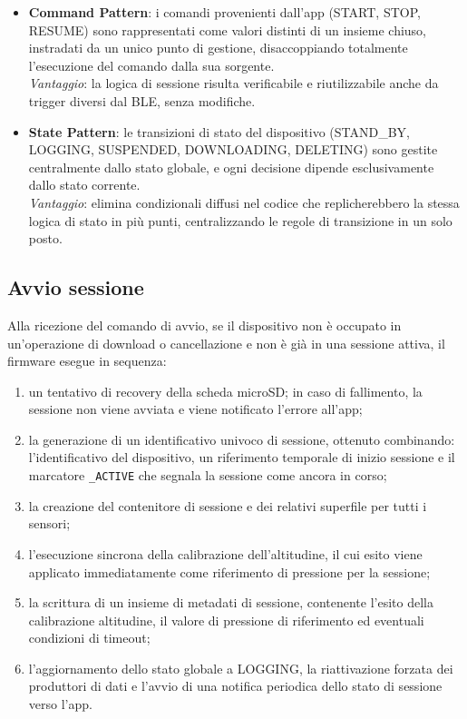\begin{itemize}
    \item \textbf{Command Pattern}: i comandi provenienti dall'app (START, STOP, RESUME) sono rappresentati come valori distinti di un insieme
    chiuso, instradati da un unico punto di gestione, disaccoppiando totalmente l'esecuzione del comando dalla sua sorgente.\\
    \textit{Vantaggio}: la logica di sessione risulta verificabile e riutilizzabile anche da trigger diversi dal BLE, senza modifiche.
    \item \textbf{State Pattern}: le transizioni di stato del dispositivo (STAND\_BY, LOGGING, SUSPENDED, DOWNLOADING, DELETING) sono gestite
    centralmente dallo stato globale, e ogni decisione dipende esclusivamente dallo stato corrente.\\
    \textit{Vantaggio}: elimina condizionali diffusi nel codice che replicherebbero la stessa logica di stato in più punti, centralizzando le
    regole di transizione in un solo posto.
\end{itemize}

\subsection{Avvio sessione}

Alla ricezione del comando di avvio, se il dispositivo non è occupato in un'operazione di download o cancellazione e non è già in una sessione
attiva, il firmware esegue in sequenza:

\begin{enumerate}
    \item un tentativo di recovery della scheda microSD; in caso di fallimento, la sessione non viene avviata e viene notificato l'errore all'app;
    \item la generazione di un identificativo univoco di sessione, ottenuto combinando: l'identificativo del dispositivo, un riferimento temporale di
    inizio sessione e il marcatore \texttt{\_ACTIVE} che segnala la sessione come ancora in corso;
    \item la creazione del contenitore di sessione e dei relativi superfile per tutti i sensori;
    \item l'esecuzione sincrona della calibrazione dell'altitudine, il cui esito viene applicato immediatamente come riferimento di pressione per la 
    sessione;
    \item la scrittura di un insieme di metadati di sessione, contenente l'esito della calibrazione altitudine, il valore di pressione di
    riferimento ed eventuali condizioni di timeout;
    \item l'aggiornamento dello stato globale a LOGGING, la riattivazione forzata dei produttori di dati e l'avvio di una notifica periodica dello stato 
    di sessione verso l'app.
\end{enumerate}

